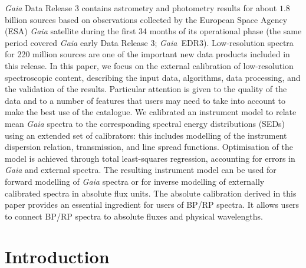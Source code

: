 \documentclass{aa}
\newcommand{\gedr}{\gaia~EDR3\xspace}
\newcommand{\gaia}{\textit{Gaia}\xspace}
\begin{document}
\abstract
{\gaia Data Release 3 contains astrometry and photometry results for about $1.8$ billion sources based on observations collected by the European Space Agency (ESA) \gaia satellite during the first 34 months of its operational phase (the same period covered \gaia early Data Release 3; \gedr). Low-resolution spectra for 220 million sources are one of the important new data products included in this release.}
{In this paper, we focus on the external calibration of low-resolution spectroscopic content, describing the input data, algorithms, data processing, and the validation of the results. Particular attention is given to the quality of the data and to a number of features that users may need to take into account to make the best use of the catalogue.}
{We calibrated an instrument model to relate mean \gaia spectra to the corresponding spectral energy distributions (SEDs) using an extended set of  calibrators: this includes modelling of the instrument dispersion relation, transmission, and line spread functions. Optimisation of the model is achieved through total least-squares regression, accounting for errors in \gaia and external spectra.
}
{The resulting instrument model can be used for forward modelling of \gaia spectra or for inverse modelling of externally calibrated spectra in absolute flux units.}
{The absolute calibration derived in this paper provides an essential ingredient for users of BP/RP spectra. It allows users to connect BP/RP spectra to absolute fluxes and physical wavelengths.
} 
 

\maketitle


\section{Introduction}\label{sec:introduction}
\end{document}
